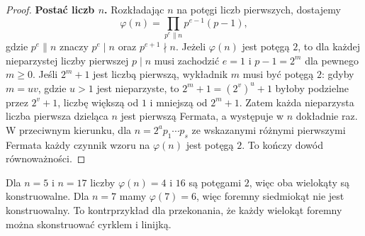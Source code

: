 \begin{proof}
\textbf{Postać liczb $n$.}
Rozkładając $n$ na potęgi liczb pierwszych, dostajemy
\[
 \varphi(n)=\prod_{p^e\parallel n}p^{e-1}(p-1),
\]
gdzie $p^e\parallel n$ znaczy $p^e\mid n$ oraz
$p^{e+1}\nmid n$. Jeżeli $\varphi(n)$ jest potęgą $2$,
to dla każdej nieparzystej liczby pierwszej $p\mid n$
musi zachodzić $e=1$ i $p-1=2^m$ dla pewnego $m\ge0$.
Jeśli $2^m+1$ jest liczbą pierwszą, wykładnik $m$
musi być potęgą $2$: gdyby $m=uv$, gdzie $u>1$
jest nieparzyste, to $2^m+1=(2^v)^u+1$
byłoby podzielne przez $2^v+1$, liczbę większą od $1$
i mniejszą od $2^m+1$. Zatem każda nieparzysta
liczba pierwsza dzieląca $n$ jest pierwszą Fermata,
a występuje w $n$ dokładnie raz. W przeciwnym kierunku,
dla $n=2^a p_1\cdots p_s$ ze wskazanymi różnymi
pierwszymi Fermata każdy czynnik wzoru na $\varphi(n)$
jest potęgą $2$. To kończy dowód równoważności.
\end{proof}
\begin{przyklad}\label{aa:prz:polygon-examples}
Dla $n=5$ i $n=17$ liczby $\varphi(n)=4$ i $16$ są potęgami $2$, więc oba wielokąty są konstruowalne. Dla $n=7$ mamy $\varphi(7)=6$, więc foremny siedmiokąt nie jest konstruowalny. To kontrprzykład dla przekonania, że każdy wielokąt foremny można skonstruować cyrklem i linijką.
\end{przyklad}

